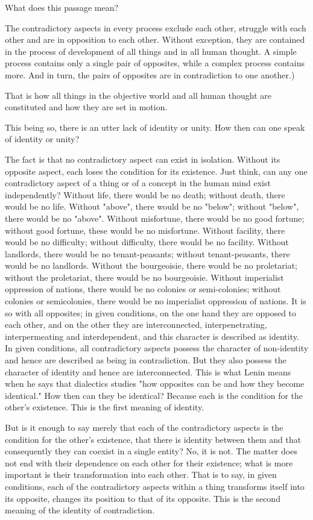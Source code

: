 \documentclass{article}
\begin{document}
What does this passage mean?

The contradictory aspects in every process exclude each other, struggle with
each other and are in opposition to each other. Without exception, they are
contained in the process of development of all things and in all human thought.
A simple process contains only a single pair of opposites, while a complex
process contains more. And in turn, the pairs of opposites are in contradiction
to one another.)

That is how all things in the objective world and all human thought are
constituted and how they are set in motion.

This being so, there is an utter lack of identity or unity. How then can one
speak of identity or unity?

The fact is that no contradictory aspect can exist in isolation. Without its
opposite aspect, each loses the condition for its existence. Just think, can
any one contradictory aspect of a thing or of a concept in the human mind exist
independently? Without life, there would be no death; without death, there
would be no life. Without "above", there would be no "below"; without "below",
there would be no "above". Without misfortune, there would be no good fortune;
without good fortune, these would be no misfortune. Without facility, there
would be no difficulty; without difficulty, there would be no facility. Without
landlords, there would be no tenant-peasants; without tenant-peasants, there
would be no landlords. Without the bourgeoisie, there would be no proletariat;
without the proletariat, there would be no bourgeoisie. Without imperialist
oppression of nations, there would be no colonies or semi-colonies; without
colonies or semicolonies, there would be no imperialist oppression of nations.
It is so with all opposites; in given conditions, on the one hand they are
opposed to each other, and on the other they are interconnected,
interpenetrating, interpermeating and interdependent, and this character is
described as identity. In given conditions, all contradictory aspects possess
the character of non-identity and hence are described as being in
contradiction. But they also possess the character of identity and hence are
interconnected. This is what Lenin means when he says that dialectics studies
"how opposites can be and how they become identical." How then can they be
identical? Because each is the condition for the other's existence. This is the
first meaning of identity.

But is it enough to say merely that each of the contradictory aspects is the
condition for the other's existence, that there is identity between them and
that consequently they can coexist in a single entity? No, it is not. The
matter does not end with their dependence on each other for their existence;
what is more important is their transformation into each other. That is to say,
in given conditions, each of the contradictory aspects within a thing
transforms itself into its opposite, changes its position to that of its
opposite. This is the second meaning of the identity of contradiction.
\end{document}

